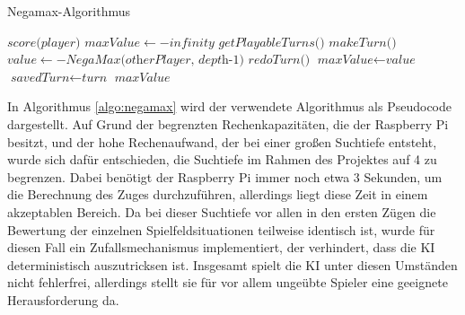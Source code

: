 \begin{algorithm}
\caption{Negamax-Algorithmus} \label{algo:negamax}
\begin{algorithmic}[1]
\State \Return $\textit{score(player)}$
\EndIf
\State $\textit{maxValue} \gets -\textit{infinity}$
\State $\textit{getPlayableTurns()}$
\State $\textit{makeTurn()}$
\State $\textit{value} \gets -\textit{NegaMax(otherPlayer, depth-1)}$
\State $\textit{redoTurn()}$
\State $\textit{maxValue} \gets \textit{value}$
\State $\textit{savedTurn} \gets \textit{turn}$
\EndIf
\EndIf
\EndWhile
\State \Return $\textit{maxValue}$
\EndProcedure
\end{algorithmic}
\end{algorithm}

In Algorithmus \ref{algo:negamax} wird der verwendete Algorithmus als Pseudocode dargestellt.
Auf Grund der begrenzten Rechenkapazitäten, die der Raspberry Pi besitzt, und der hohe Rechenaufwand, der bei einer großen Suchtiefe entsteht, wurde sich dafür entschieden, die Suchtiefe im Rahmen des Projektes auf 4 zu begrenzen. Dabei benötigt der Raspberry Pi immer noch etwa 3 Sekunden, um die Berechnung des Zuges durchzuführen, allerdings liegt diese Zeit in einem akzeptablen Bereich. Da bei dieser Suchtiefe vor allen in den ersten Zügen die Bewertung der einzelnen Spielfeldsituationen teilweise identisch ist, wurde für diesen Fall ein Zufallsmechanismus implementiert, der verhindert, dass die KI deterministisch auszutricksen ist. Insgesamt spielt die KI unter diesen Umständen nicht fehlerfrei, allerdings stellt sie für vor allem ungeübte Spieler eine geeignete Herausforderung da.
